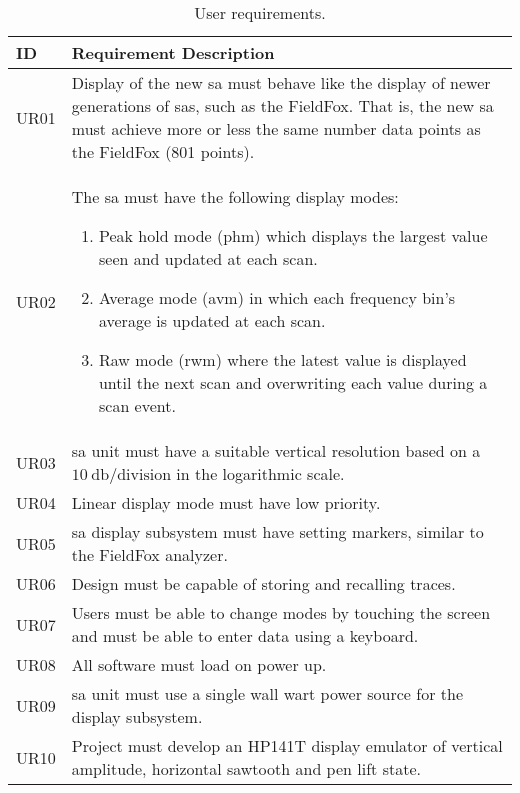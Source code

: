 \documentclass[class=report,11pt,crop=false]{standalone}
\begin{document}
\begin{table}[!ht]
	\centering
	\caption{User requirements.}
	\label{tab:user-requirements}
	\begin{tabular}{|m{5em}|m{40em}|}
		\hline
		\textbf{ID}	& \textbf{Requirement Description}\\
		\hline
		UR01	& Display of the new \acrshort{sa} must behave like the display of newer generations of \acrshort{sa}s, such as the FieldFox. That is, the new \acrshort{sa} must achieve more or less the same number data points as the FieldFox (801 points). \\
		\hline
		UR02	& The \acrshort{sa} must have the following display modes:
		\begin{enumerate}[label=(\alph*)]
			\item 
			Peak hold mode (\acrshort{phm}) which displays the largest value seen and updated at each scan.
			\item 
			Average mode (\acrshort{avm}) in which each frequency bin's average is updated at each scan. 
			\item 
			Raw mode (\acrshort{rwm}) where the latest value is displayed until the next scan and overwriting each value during a scan event.
		\end{enumerate}\\
		\hline
		UR03	& \acrshort{sa} unit must have a suitable vertical resolution based on a $\SI{10}{\decibel}\text{/division}$ in the logarithmic scale.\\
		\hline
		UR04	& Linear display mode must have low priority.\\
		\hline
		UR05	& \acrshort{sa} display subsystem must have setting markers, similar to the FieldFox analyzer.\\
		\hline
		UR06	& Design must be capable of storing and recalling traces.\\
		\hline
		UR07	& Users must be able to change modes by touching the screen and must be able to enter data using a keyboard.\\
		\hline
		UR08	& All software must load on power up.\\
		\hline
		UR09	& \acrshort{sa} unit must use a single wall wart power source for the display subsystem.\\
		\hline
		UR10	& Project must develop an HP141T display emulator of vertical amplitude, horizontal sawtooth and pen lift state.\\
		\hline
	\end{tabular}
\end{table}
\end{document}
